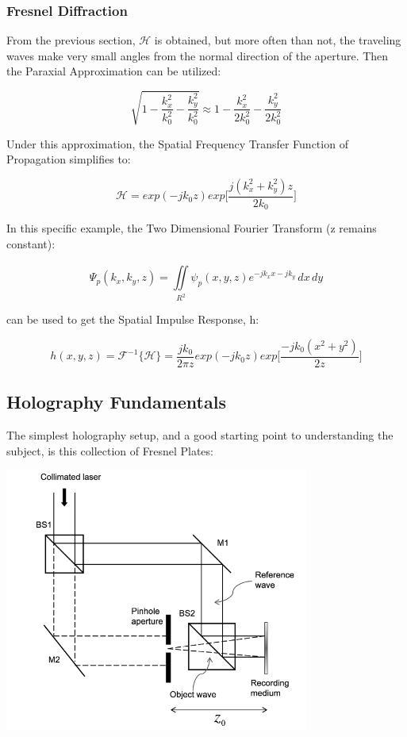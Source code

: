 \documentclass[12pt]{article}
\begin{document}
\subsubsection{Fresnel Diffraction}

From the previous section, \(\mathscr{H}\) is obtained, but more often than not, the traveling waves make very small angles from the normal direction of the aperture. Then the Paraxial Approximation can be utilized:

\begin{equation}
	\sqrt{1 - \frac{k_{x}^2}{k_{0}^2} - \frac{k_{y}^2}{k_0^2}} \approx 1 - \frac{k_{x}^2}{2k_{0}^2} - \frac{k_{y}^2}{2k_{0}^2}
\end{equation}

Under this approximation, the Spatial Frequency Transfer Function of Propagation simplifies to:

\begin{equation}
	\mathscr{H} = exp(-jk_{0}z)exp\bigg[\frac{j(k_{x}^2 + k_{y}^2)z}{2k_{0}}\bigg]
\end{equation}

In this specific example, the Two Dimensional Fourier Transform (z remains constant):

\begin{equation}
	\Psi_{p}(k_{x},k_{y},z) = \iint \limits_{R^2}^{} \psi_{p}(x,y,z)e^{-jk_{x}x - jk_{y}} \,dx\,dy
\end{equation}

can be used to get the Spatial Impulse Response, h:

\begin{equation}
	h(x,y,z) = \mathscr{F}^{-1}\{\mathscr{H}\} = \frac{jk_{0}}{2\pi z} exp(-jk_{0}z)exp\bigg[\frac{-jk_{0}(x^2 + y^2)}{2z}\bigg]
\end{equation}

\subsection{Holography Fundamentals}

The simplest holography setup, and a good starting point to understanding the subject, is this collection of Fresnel Plates:

\begin{center}
	\includegraphics[width=100mm]{tupac7.png}
\end{center}
\end{document}
